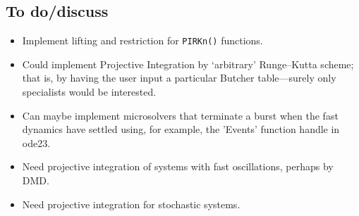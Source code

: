 \begin{devMan}
%






\section{To do/discuss}
\begin{itemize}
\item Implement lifting and restriction for \verb|PIRKn()| functions.

\item Could implement Projective Integration by `arbitrary' Runge--Kutta scheme; that is, by having the user input a particular Butcher table---surely only specialists would be interested.


\item Can maybe implement microsolvers that terminate a burst when the fast dynamics have settled using, for example, the 'Events' function handle in ode23. 

\item Need projective integration of systems with fast oscillations, perhaps by DMD.

\item Need projective integration for stochastic systems.

\end{itemize}
\end{devMan}


